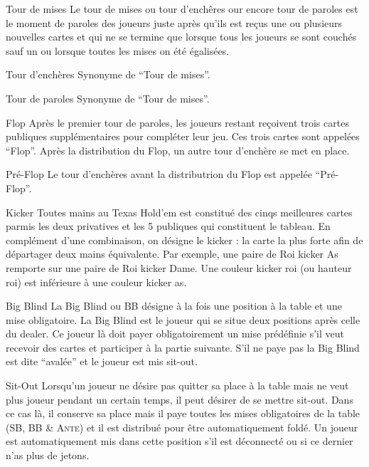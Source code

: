 \begin{df}{Tour de mises}
	Le tour de mises ou tour d'enchêres our encore tour de paroles est le moment de paroles des joueurs juste après qu'ils est reçus une ou plusieurs nouvelles cartes et qui ne se termine que lorsque tous les joueurs se sont couchés sauf un ou lorsque toutes les mises on été égalisées.
\end{df}

\begin{df}{Tour d'enchères}
	Synonyme de ``Tour de mises''.
\end{df}

\begin{df}{Tour de paroles}
	Synonyme de ``Tour de mises''.
\end{df}

\begin{df}{Flop}
	Après le premier tour de paroles, les joueurs restant reçoivent trois cartes publiques supplémentaires pour compléter leur jeu. Ces trois cartes sont appelées ``Flop''. Après la distribution du Flop, un autre tour d'enchère se met en place.
\end{df}

\begin{df}{Pré-Flop}
	Le tour d'enchères avant la distributrion du Flop est appelée ``Pré-Flop''.
\end{df}

\begin{df}{Kicker}
	Toutes mains au Texas Hold'em est constitué des cinqs meilleures cartes parmis les deux privatives et les 5 publiques qui constituent le tableau. En complément d'une combinaison, on désigne le kicker : la carte la plus forte afin de départager deux mains équivalente. Par exemple, une paire de Roi kicker As remporte sur une paire de Roi kicker Dame. Une couleur kicker roi (ou hauteur roi) est inférieure à une couleur kicker as.
\end{df}

\begin{df}{Big Blind}
	La Big Blind ou BB désigne à la fois une position à la table et une mise obligatoire. La Big Blind est le joueur qui se situe deux positions après celle du dealer. Ce joueur là doit payer obligatoirement un mise prédéfinie s'il veut recevoir des cartes et participer à la partie suivante. S'il ne paye pas la Big Blind est dite ``avalée'' et le joueur est mis sit-out.
\end{df}

\begin{df}{Sit-Out}
	Lorsqu'un joueur ne désire pas quitter sa place à la table mais ne veut plus joueur pendant un certain temps, il peut désirer de se mettre sit-out. Dans ce cas là, il conserve sa place mais il paye toutes les mises obligatoires de la table (SB, BB \& \textsc{Ante}) et il est distribué pour être automatiquement foldé. Un joueur est automatiquement mis dans cette position s'il est déconnecté ou si ce dernier n'as plus de jetons.
\end{df}

